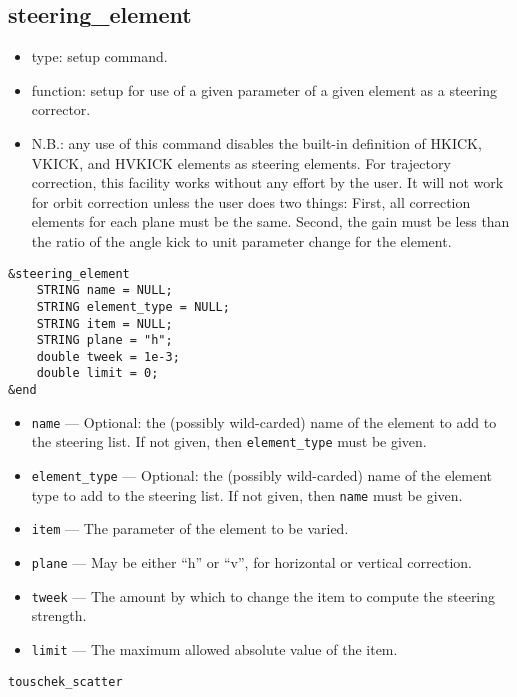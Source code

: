 \documentclass[11pt]{article}
\begin{document}
\subsection{steering\_element \label{subsec:steeringelement}}

\begin{itemize}
\item type: setup command.
\item function: setup for use of a given parameter of a given element as a steering corrector.
\item N.B.: any use of this command disables the built-in definition of HKICK, VKICK, and HVKICK elements
as steering elements.  For trajectory correction, this facility works without any effort by the user.
It will not work for orbit correction unless the user does two things: First, all correction elements
for each plane must be the same.  Second, the gain must be less than the ratio of the angle kick to
unit parameter change for the element.
\end{itemize}

\begin{verbatim}
&steering_element
    STRING name = NULL;
    STRING element_type = NULL;
    STRING item = NULL;
    STRING plane = "h";
    double tweek = 1e-3;
    double limit = 0;
&end
\end{verbatim}

\begin{itemize}
\item \verb|name| --- Optional: the (possibly wild-carded) name of the element to add to the steering list.
        If not given, then \verb|element_type| must be given.
\item \verb|element_type| --- Optional: the (possibly wild-carded) name of the element type to add to the
        steering list.  If not given, then \verb|name| must be given.
\item \verb|item| --- The parameter of the element to be varied.
\item \verb|plane| --- May be either ``h'' or ``v'', for horizontal or vertical correction.
\item \verb|tweek| --- The amount by which to change the item to compute the steering strength.
\item \verb|limit| --- The maximum allowed absolute value of the item.
\end{itemize}

\begin{latexonly}
\newpage
\begin{center}{\Large\verb|touschek_scatter|}\end{center}
\end{latexonly}
\end{document}
